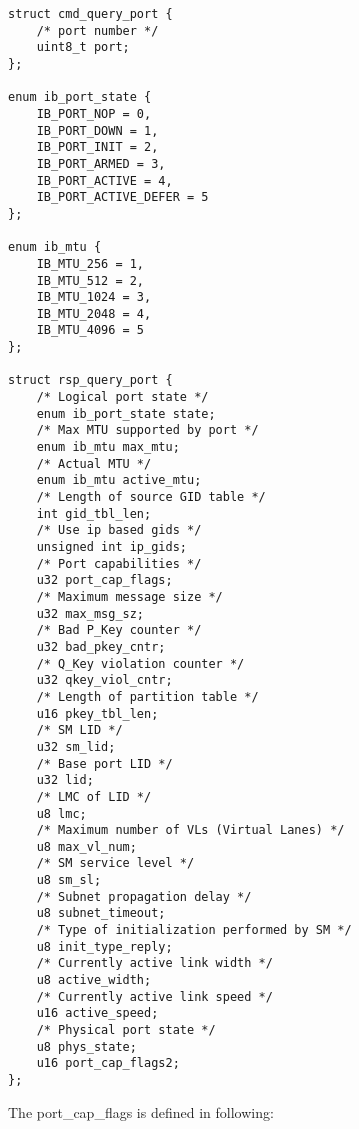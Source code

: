 \begin{lstlisting}
struct cmd_query_port {
    /* port number */
    uint8_t port;
};

enum ib_port_state {
    IB_PORT_NOP = 0,
    IB_PORT_DOWN = 1,
    IB_PORT_INIT = 2,
    IB_PORT_ARMED = 3,
    IB_PORT_ACTIVE = 4,
    IB_PORT_ACTIVE_DEFER = 5
};

enum ib_mtu {
    IB_MTU_256 = 1,
    IB_MTU_512 = 2,
    IB_MTU_1024 = 3,
    IB_MTU_2048 = 4,
    IB_MTU_4096 = 5
};

struct rsp_query_port {
    /* Logical port state */
    enum ib_port_state state;
    /* Max MTU supported by port */
    enum ib_mtu max_mtu;
    /* Actual MTU */
    enum ib_mtu active_mtu;
    /* Length of source GID table */
    int gid_tbl_len;
    /* Use ip based gids */
    unsigned int ip_gids;
    /* Port capabilities */
    u32 port_cap_flags;
    /* Maximum message size */
    u32 max_msg_sz;
    /* Bad P_Key counter */
    u32 bad_pkey_cntr;
    /* Q_Key violation counter */
    u32 qkey_viol_cntr;
    /* Length of partition table */
    u16 pkey_tbl_len;
    /* SM LID */
    u32 sm_lid;
    /* Base port LID */
    u32 lid;
    /* LMC of LID */
    u8 lmc;
    /* Maximum number of VLs (Virtual Lanes) */
    u8 max_vl_num;
    /* SM service level */
    u8 sm_sl;
    /* Subnet propagation delay */
    u8 subnet_timeout;
    /* Type of initialization performed by SM */
    u8 init_type_reply;
    /* Currently active link width */
    u8 active_width;
    /* Currently active link speed */
    u16 active_speed;
    /* Physical port state */
    u8 phys_state;
    u16 port_cap_flags2;
};
\end{lstlisting}

The port_cap_flags is defined in following:

